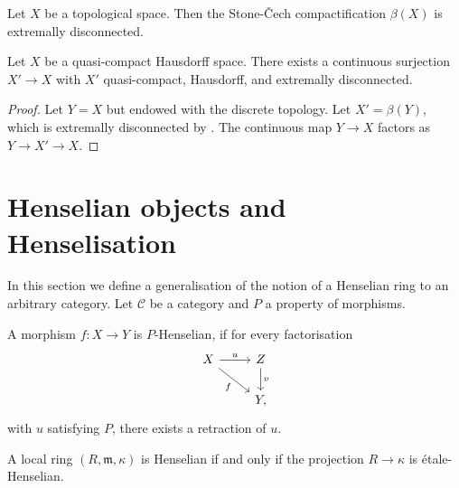 \begin{theorem}
    Let \(X\) be a topological space. Then the Stone-Čech compactification \(\beta(X)\) is extremally disconnected.
    \label{thm:stone-cech-extremally-disconnected}
    \mathlibok
\end{theorem}

\begin{proposition}
  Let $X$ be a quasi-compact Hausdorff space. There exists a continuous surjection $X' \to X$ with $X'$ quasi-compact, Hausdorff, and extremally disconnected.
  \label{thm:extremally-disconnected-cover}
\end{proposition}

\begin{proof}
  Let $Y=X$ but endowed with the discrete topology. Let $X'=\beta (Y)$, which is extremally disconnected by . The continuous map $Y \to X$ factors as $Y \to X' \to X$.
\end{proof}

\section{Henselian objects and Henselisation}

In this section we define a generalisation of the notion of a Henselian ring to an arbitrary category. Let $\mathcal{C}$ be a category
and $P$ a property of morphisms.

\begin{definition}[Henselian]
    A morphism $f\colon X \to Y$ is $P$-Henselian, if for every factorisation
    \[
    \begin{tikzcd}
        X \arrow{r}{u} \arrow[swap]{dr}{f} & Z \arrow{d}{v} \\
                    & Y,
    \end{tikzcd}
    \] with $u$ satisfying $P$, there exists a retraction of $u$.
\end{definition}

\begin{example}
    A local ring $(R, \mathfrak{m}, \kappa)$ is Henselian if and only if the projection $R \to \kappa$ is étale-Henselian.
\end{example}

